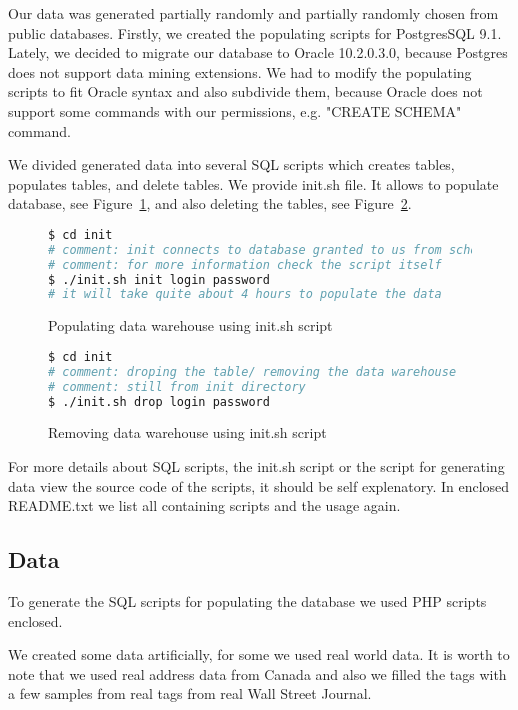 
Our data was generated partially randomly and partially randomly chosen from public databases.
Firstly, we created the populating scripts for PostgresSQL 9.1. Lately, we decided to migrate
our database to Oracle 10.2.0.3.0, because Postgres does not support data mining extensions.
We had to modify the populating scripts to fit Oracle syntax and also subdivide them,
because Oracle does not support some commands with our permissions, e.g. "CREATE SCHEMA" command.

We divided generated data into several SQL scripts which creates tables, populates tables, and delete tables.
We provide init.sh file. It allows to populate database, see Figure~\ref{l:ml1_init}, and also deleting the tables, see Figure~\ref{l:ml1_drop}.
\begin{figure}[!hbp]
\begin{lstlisting}[language=bash]
$ cd init
# comment: init connects to database granted to us from school
# comment: for more information check the script itself
$ ./init.sh init login password
# it will take quite about 4 hours to populate the data
\end{lstlisting}
\caption{Populating data warehouse using  init.sh script} \label{l:ml1_init}
\end{figure}

\begin{figure}[!hbp]
\begin{lstlisting}[language=bash]
$ cd init
# comment: droping the table/ removing the data warehouse 
# comment: still from init directory
$ ./init.sh drop login password
\end{lstlisting}
\caption{Removing data warehouse using  init.sh script} \label{l:ml1_drop}
\end{figure}

For more details about SQL scripts, the init.sh script or the script for generating data view the source code of the scripts, it should be self explenatory. In enclosed README.txt we list all containing scripts and the usage again.

\subsection*{Data}
To generate the SQL scripts for populating the database we used PHP scripts enclosed.

We created some data artificially, for some we used real world data.
It is worth to note that we used real address data from Canada and also we filled the tags with a few samples from real tags from real Wall Street Journal.

